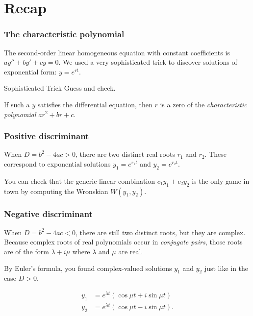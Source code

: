 \def\encoding{UTF-8}

\def\mytitle{Repeated Roots}
\def\subtitle{Second-order Linear Homogeneous Equations}
\def\myauthor{D. Rosoff}
\def\affiliation{The College of Idaho}
\def\mydate{20 March 2013}
\def\latexmode{beamer}
\def\fonttheme{structurebold}
\def\colortheme{crane}
\def\theme{Szeged}

\section{Recap}
\label{recap}

\begin{frame}

\frametitle{The characteristic polynomial}
\label{thecharacteristicpolynomial}

The second-order linear homogeneous equation with constant coefficients is
$ ay'' + by' + cy = 0 $. We used a very sophisticated trick to discover solutions of exponential form: $ y = e^{rt} $.

 \pause 


\begin{block}{Sophisticated Trick}
    Guess and check.
\end{block}



\pause


If such a $ y $ satisfies the differential equation, then $ r $ is a zero of the \emph{characteristic polynomial} $ ar^2 + br + c $.

\end{frame}

\begin{frame}

\frametitle{Positive discriminant}
\label{positivediscriminant}

When $ D = b^2 - 4ac > 0 $, there are two distinct real roots $ r_1 $ and $ r_2 $. These correspond to exponential solutions $ y_1 = e^{r_1 t} $ and $ y_2 = e^{r_2 t} $.

You can check that the generic linear combination $ c_1 y_1 + c_2 y_2 $ is the only game in town by computing the Wronskian $ W(y_1, y_2) $.

\end{frame}

\begin{frame}

\frametitle{Negative discriminant}
\label{negativediscriminant}

When $ D = b^2 - 4ac < 0 $, there are still two distinct roots, but they are complex. Because complex roots of real polynomials occur in \emph{conjugate pairs}, those roots are of the form $ \lambda + i \mu $ where $ \lambda $ and $ \mu $ are real.

By Euler's formula, you found complex-valued solutions $ y_1 $ and $ y_2 $ just like in the case $ D > 0 $.
 
\begin{align*} 
    y_1 &= e^{\lambda t} (\cos{\mu t} + i \sin{\mu t}) \\
    y_2 &= e^{\lambda t} (\cos{\mu t} - i \sin{\mu t}). 
\end{align*}


\end{frame}

